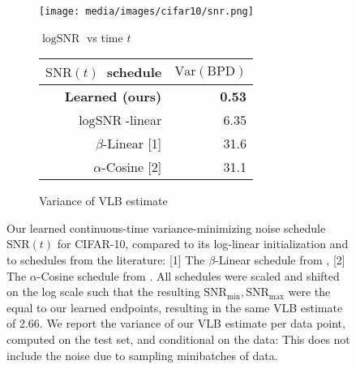 \documentclass{article}
\newcommand{\snr}{\text{SNR}}
\newcommand{\snrmin}{\text{SNR}_{\text{min}}}
\newcommand{\snrmax}{\text{SNR}_{\text{max}}}
\begin{document}
\begin{figure}[t]
    \centering\footnotesize
    \begin{subfigure}[b]{0.35\textwidth}
        \centering
        \texttt{[image: media/images/cifar10/snr.png]}
        \caption{$\log\snr$ vs time $t$ }
        \label{fig:snr_schedule}
    \end{subfigure}\hspace{1.5cm}
    \begin{subfigure}[b]{0.35\textwidth}  
        \centering
        \begin{tabular}{rr}
        $\snr(t)$~schedule & $\mathrm{Var}(\text{BPD})$\\
        \midrule
        \textbf{Learned (ours)} & \textbf{0.53}\\
        $\log\snr$-linear & 6.35\\
        $\beta$-Linear [1] & 31.6\\
        $\alpha$-Cosine [2] & 31.1\\
        \bottomrule
        \end{tabular}
        \caption{Variance of VLB estimate}
        \label{table:variance}
    \end{subfigure}
    \caption{Our learned continuous-time variance-minimizing noise schedule $\snr(t)$ for CIFAR-10, compared to its log-linear initialization and to schedules from the literature: [1] The $\beta$-Linear schedule from \cite{ho2020denoising}, [2] The $\alpha$-Cosine schedule from \cite{nichol2021improved}. All schedules were scaled and shifted on the log scale such that the resulting $\snrmin, \snrmax$ were the equal to our learned endpoints, resulting in the same VLB estimate of 2.66. We report the variance of our VLB estimate per data point, computed on the test set, and conditional on the data: This does not include the noise due to sampling minibatches of data.}
\end{figure}
\end{document}
